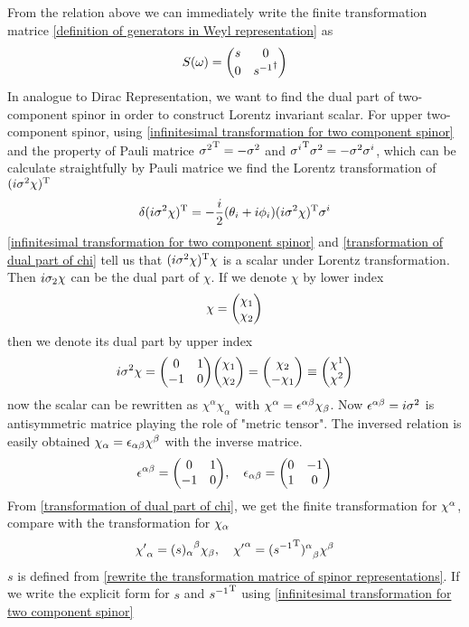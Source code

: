 From the relation above we can immediately write the finite transformation matrice \eqref{definition of generators in Weyl representation} as
\begin{equation} \label{rewrite the transformation matrice of spinor representations}
S(\w) = \mqty(
s &
0                           \\
0                           &
{s^{-1}}^{\dagger})
\end{equation}
In analogue to Dirac Representation, we want to find the dual part of two-component spinor in order to construct Lorentz invariant scalar. For upper two-component spinor, using \eqref{infinitesimal transformation for two component spinor} and the property of Pauli matrice ${\sigma^{2}}^{\text{T}}=-\sigma^{2}$ and ${\sigma^{i}}^{\text{T}}\sigma^{2} = -\sigma^{2}\sigma^{i}$, which can be calculate straightfully by Pauli matrice
we find the Lorentz transformation of $(i\sigma^2\chi)^{\text{T}}$
\begin{equation} \label{transformation of dual part of chi}
\delta{(i\sigma^2\chi)^{\text{T}}}
=-\frac{i}{2} (\theta_i + i \phi_i)  (i\sigma^2 \chi)^{\text{T}} \sigma^{i}
\end{equation}
\eqref{infinitesimal transformation for two component spinor} and \eqref{transformation of dual part of chi} tell us that
$(i\sigma^2\chi)^{\text{T}}\chi$ is a scalar under Lorentz transformation. Then $i\sigma_2\chi$ can be the dual part of $\chi$.
If we denote $\chi$ by lower index
\begin{equation}
  \chi = \mqty(\chi_1 \\ \chi_2)
\end{equation}
then we denote its dual part by upper index
\begin{equation}
  i\s^{2}\chi = \mqty(0 & 1 \\ -1 & 0)
\mqty(\chi_1 \\ \chi_2)
=\mqty(\chi_2 \\ -\chi_1)
\equiv \mqty(\chi^{1}\\\chi^{2})
\end{equation}
now the scalar can be rewritten as $\chi^{\alpha} \chi_{\alpha}$
with $\chi^{\alpha} =  \epsilon^{\alpha\beta}\chi_{\beta}$. Now $\epsilon^{\alpha\beta} =i\sigma^{2} $ is antisymmetric matrice playing the role of "metric tensor". The inversed relation is easily obtained $\chi_{\alpha} = \epsilon_{\alpha\beta}\chi^{\beta}$ with the inverse matrice.
\begin{equation}
  \e^{\a\be} = \mqty(0 & 1 \\ -1 & 0),\quad
\e_{\a\be} =\mqty(0 & -1 \\ 1 & 0)
\end{equation}
From \eqref{transformation of dual part of chi}, we get the finite transformation for $\chi^{\alpha}$, compare with the transformation for $\chi_{\alpha}$
\begin{equation} \label{Lorentz transformation for chi}
{\chi'}_{\alpha} = {(s)_{\alpha}}^{\beta}\chi_{\beta}
,\quad
{\chi'}^{\alpha} = {({s^{-1}}^{\text{T}})^{\alpha}}_{\beta}\chi^{\beta}
\end{equation}
$s$ is defined from \eqref{rewrite the transformation matrice of spinor representations}. If we write the explicit form for $s$ and
${s^{-1}}^{\text{T}}$ using \eqref{infinitesimal transformation for two component spinor}

